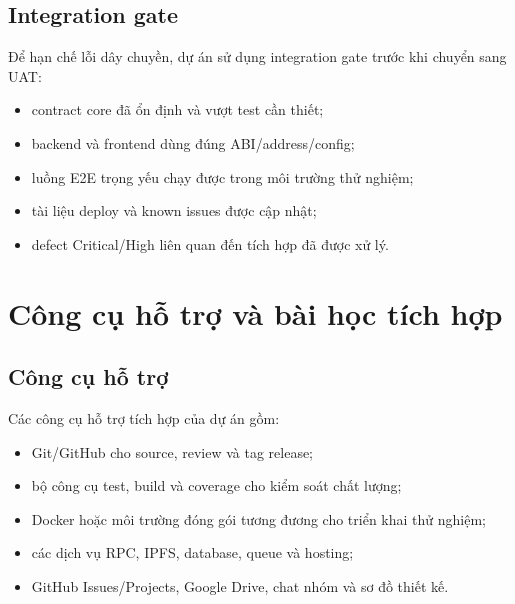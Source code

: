 
\fi
\subsection{Integration gate}

Để hạn chế lỗi dây chuyền, dự án sử dụng integration gate trước khi chuyển sang UAT:

\begin{itemize}
  \item contract core đã ổn định và vượt test cần thiết;
  \item backend và frontend dùng đúng ABI/address/config;
  \item luồng E2E trọng yếu chạy được trong môi trường thử nghiệm;
  \item tài liệu deploy và known issues được cập nhật;
  \item defect Critical/High liên quan đến tích hợp đã được xử lý.
\end{itemize}



\iffalse
\section{Công cụ hỗ trợ và bài học tích hợp}

\subsection{Công cụ hỗ trợ}

Các công cụ hỗ trợ tích hợp của dự án gồm:

\begin{itemize}
  \item Git/GitHub cho source, review và tag release;
  \item bộ công cụ test, build và coverage cho kiểm soát chất lượng;
  \item Docker hoặc môi trường đóng gói tương đương cho triển khai thử nghiệm;
  \item các dịch vụ RPC, IPFS, database, queue và hosting;
  \item GitHub Issues/Projects, Google Drive, chat nhóm và sơ đồ thiết kế.
\end{itemize}

